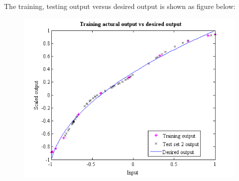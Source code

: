 \documentclass[epsfig]{article}
\begin{document}
The training, testing output versus desired output is shown as figure below:

\begin{figure}[!htb] 
\centering\includegraphics[width=4.5in]{output_test2.png} 
\end{figure} 
\end{document}
